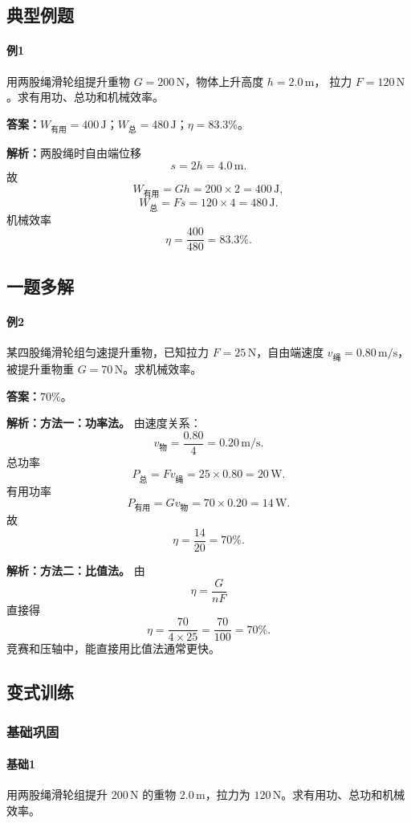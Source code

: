 \documentclass[12pt,a4paper]{ctexart}
\newcommand{\Ans}[1]{\par\noindent\textbf{答案：}#1\par}
\newcommand{\Sol}[1]{\par\noindent\textbf{解析：}#1\par}
\begin{document}
\subsection{典型例题}
\paragraph{例1}
用两股绳滑轮组提升重物 $G=200\,\mathrm{N}$，物体上升高度 $h=2.0\,\mathrm{m}$，
拉力 $F=120\,\mathrm{N}$。求有用功、总功和机械效率。

\Ans{$W_{\text{有用}}=400\,\mathrm{J}$；$W_{\text{总}}=480\,\mathrm{J}$；$\eta=83.3\%$。}
\Sol{两股绳时自由端位移
\[
s=2h=4.0\,\mathrm{m}.
\]
故
\[
W_{\text{有用}}=Gh=200\times 2=400\,\mathrm{J},
\]
\[
W_{\text{总}}=Fs=120\times 4=480\,\mathrm{J}.
\]
机械效率
\[
\eta=\frac{400}{480}=83.3\%.
\]}

\subsection{一题多解}
\paragraph{例2}
某四股绳滑轮组匀速提升重物，已知拉力 $F=25\,\mathrm{N}$，自由端速度
$v_{\text{绳}}=0.80\,\mathrm{m/s}$，被提升重物重 $G=70\,\mathrm{N}$。求机械效率。

\Ans{$70\%$。}

\Sol{\textbf{方法一：功率法。}
由速度关系：
\[
v_{\text{物}}=\frac{0.80}{4}=0.20\,\mathrm{m/s}.
\]
总功率
\[
P_{\text{总}}=Fv_{\text{绳}}=25\times 0.80=20\,\mathrm{W}.
\]
有用功率
\[
P_{\text{有用}}=Gv_{\text{物}}=70\times 0.20=14\,\mathrm{W}.
\]
故
\[
\eta=\frac{14}{20}=70\%.
\]}

\Sol{\textbf{方法二：比值法。}
由
\[
\eta=\frac{G}{nF}
\]
直接得
\[
\eta=\frac{70}{4\times 25}=\frac{70}{100}=70\%.
\]
竞赛和压轴中，能直接用比值法通常更快。}

\subsection{变式训练}

\subsubsection*{基础巩固}
\paragraph{基础1}
用两股绳滑轮组提升 $200\,\mathrm{N}$ 的重物 $2.0\,\mathrm{m}$，拉力为
$120\,\mathrm{N}$。求有用功、总功和机械效率。
\end{document}
